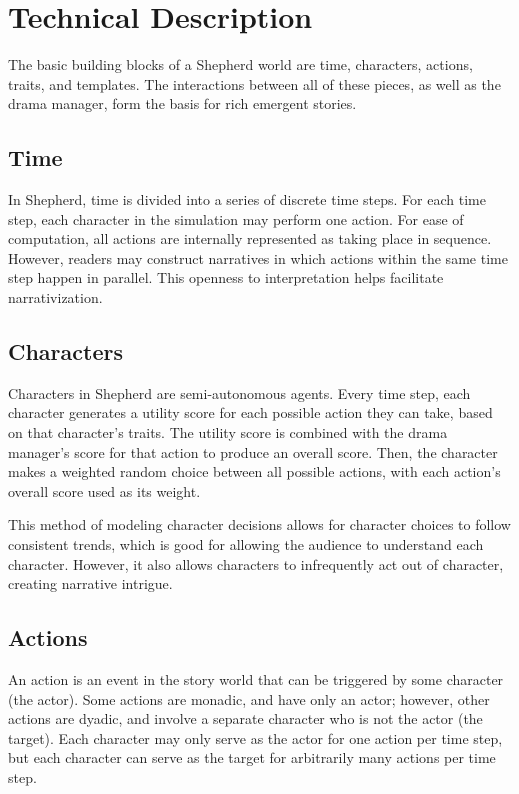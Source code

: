 \documentclass[letterpaper]{article}
\begin{document}
\section{Technical Description}
The basic building blocks of a Shepherd world are time, characters, actions, traits, and
templates. The interactions between all of these pieces, as well as the drama manager,
form the basis for rich emergent stories.

\subsection{Time}
In Shepherd, time is divided into a series of discrete time steps. For each time step,
each character in the simulation may perform one action. For ease of computation, all
actions are internally represented as taking place in sequence. However, readers may
construct narratives in which actions within the same time step happen in parallel. This
openness to interpretation helps facilitate narrativization.

\subsection{Characters}
Characters in Shepherd are semi-autonomous agents. Every time step, each character
generates a utility score for each possible action they can take, based on that
character's traits. The utility score is combined with the drama manager's score for that
action to produce an overall score. Then, the character makes a weighted random choice
between all possible actions, with each action's overall score used as its weight.

This method of modeling character decisions allows for character choices to follow
consistent trends, which is good for allowing the audience to understand each character.
However, it also allows characters to infrequently act out of character, creating
narrative intrigue.

\subsection{Actions}
An action is an event in the story world that can be triggered by some character (the
actor). Some actions are monadic, and have only an actor; however, other actions are
dyadic, and involve a separate character who is not the actor (the target). Each character
may only serve as the actor for one action per time step, but each character can serve as
the target for arbitrarily many actions per time step.
\end{document}
